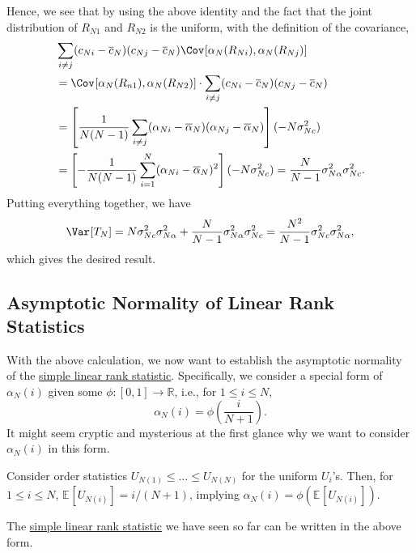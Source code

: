 \begin{explanation}
	Hence, we see that by using the above identity and the fact that the joint distribution of \(R_{N1}\) and \(R_{N2}\) is the uniform, with the definition of the covariance,
	\begin{align*}
		 & \sum_{i \neq j} (c_{Ni} - \overline{c} _N)(c_{Nj} - \overline{c} _N) \Cov_{}[\alpha _N(R_{Ni}) , \alpha _N(R_{Nj})]                                \\
		 & = \Cov_{}[\alpha _N(R_{n1}), \alpha _N(R_{N2})] \cdot \sum_{i \neq j} (c_{Ni} - \overline{c} _N)(c_{Nj} - \overline{c} _N)                         \\
		 & = \left[ \frac{1}{N(N-1)} \sum_{i \neq j} (\alpha _{Ni} - \overline{\alpha} _N) (\alpha _{Nj} - \overline{\alpha} _N) \right] (- N \sigma _{Nc}^2) \\
		 & = \left[ - \frac{1}{N(N-1)} \sum_{i=1}^{N} (\alpha _{Ni} - \overline{\alpha} _N)^2 \right] (- N \sigma _{Nc}^2)
		= \frac{N}{N-1} \sigma _{N \alpha }^2 \sigma _{Nc}^2 .
	\end{align*}
	Putting everything together, we have
	\[
		\Var_{}[T_N]
		= N \sigma _{Nc}^2 \sigma _{N \alpha }^2 + \frac{N}{N-1} \sigma _{N \alpha }^2 \sigma _{Nc}^2
		= \frac{N^2}{N-1}\sigma _{Nc}^2 \sigma _{N \alpha }^2,
	\]
	which gives the desired result.
\end{explanation}

\subsection{Asymptotic Normality of Linear Rank Statistics}
With the above calculation, we now want to establish the asymptotic normality of the \hyperref[def:simple-linrea-rank-statistic]{simple linear rank statistic}. Specifically, we consider a special form of \(\alpha _N(i)\) given some \(\phi \colon [0, 1] \to \mathbb{R} \), i.e., for \(1 \leq i \leq N\),
\[
	\alpha _N(i) = \phi \left( \frac{i}{N+1} \right) .
\]
It might seem cryptic and mysterious at the first glance why we want to consider \(\alpha _N(i)\) in this form.

\begin{intuition}
	Consider order statistics \(U_{N(1)} \leq \dots \leq U_{N(N)}\) for the uniform \(U_i\)'s. Then, for \(1 \leq i \leq N\), \(\mathbb{E}_{}[U_{N(i)}] = i / (N+1)\), implying \(\alpha _N(i) = \phi (\mathbb{E}_{}[U_{N(i)}] )\).
\end{intuition}

\begin{eg}
	The \hyperref[def:simple-linrea-rank-statistic]{simple linear rank statistic} we have seen so far can be written in the above form.
\end{eg}

